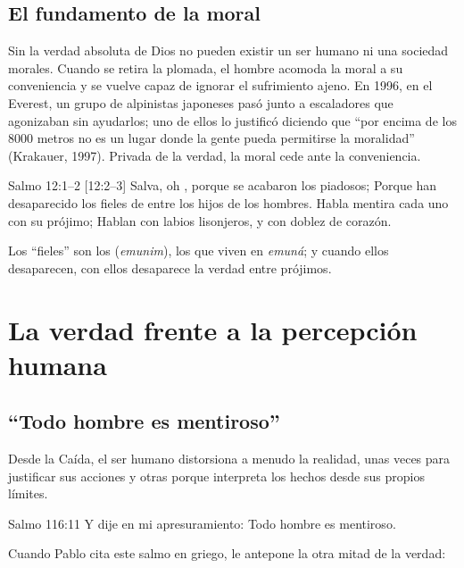 \subsection{El fundamento de la moral}
Sin la verdad absoluta de Dios no pueden existir un ser humano ni una sociedad morales. Cuando se retira la plomada, el hombre acomoda la moral a su conveniencia y se vuelve capaz de ignorar el sufrimiento ajeno. En 1996, en el Everest, un grupo de alpinistas japoneses pasó junto a escaladores que agonizaban sin ayudarlos; uno de ellos lo justificó diciendo que ``por encima de los 8000 metros no es un lugar donde la gente pueda permitirse la moralidad'' (Krakauer, 1997). Privada de la verdad, la moral cede ante la conveniencia.

\begin{verso}{Salmo 12:1–2 [12:2–3]}
Salva, oh \SENOR{}, porque se acabaron los piadosos; Porque han desaparecido los fieles de entre los hijos de los hombres. Habla mentira cada uno con su prójimo; Hablan con labios lisonjeros, y con doblez de corazón.
\end{verso}

Los ``fieles'' son los  (\emph{emunim}), los que viven en \emph{emuná}; y cuando ellos desaparecen, con ellos desaparece la verdad entre prójimos.


\section{La verdad frente a la percepción humana}

\subsection{“Todo hombre es mentiroso”}
Desde la Caída, el ser humano distorsiona a menudo la realidad, unas veces para justificar sus acciones y otras porque interpreta los hechos desde sus propios límites.

\begin{verso}{Salmo 116:11}
Y dije en mi apresuramiento: Todo hombre es mentiroso.
\end{verso}

Cuando Pablo cita este salmo en griego, le antepone la otra mitad de la verdad:

